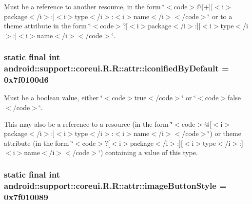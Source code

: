 Must be a reference to another resource, in the form \char`\"{}$<$code$>$@\mbox{[}+\mbox{]}\mbox{[}$<$i$>$package$<$/i$>$:\mbox{]}$<$i$>$type$<$/i$>$:$<$i$>$name$<$/i$>$$<$/code$>$\char`\"{} or to a theme attribute in the form \char`\"{}$<$code$>$?\mbox{[}$<$i$>$package$<$/i$>$:\mbox{]}\mbox{[}$<$i$>$type$<$/i$>$:\mbox{]}$<$i$>$name$<$/i$>$$<$/code$>$\char`\"{}. \hypertarget{classandroid_1_1support_1_1coreui_1_1_r_1_1attr_d091cd53f178a86e5e7803f5a1abd26a}{
\subsubsection[{iconifiedByDefault}]{\setlength{\rightskip}{0pt plus 5cm}static final int android::support::coreui.R.R::attr::iconifiedByDefault = 0x7f0100d6}}
\label{classandroid_1_1support_1_1coreui_1_1_r_1_1attr_d091cd53f178a86e5e7803f5a1abd26a}


Must be a boolean value, either \char`\"{}$<$code$>$true$<$/code$>$\char`\"{} or \char`\"{}$<$code$>$false$<$/code$>$\char`\"{}. 

This may also be a reference to a resource (in the form \char`\"{}$<$code$>$@\mbox{[}$<$i$>$package$<$/i$>$:\mbox{]}$<$i$>$type$<$/i$>$:$<$i$>$name$<$/i$>$$<$/code$>$\char`\"{}) or theme attribute (in the form \char`\"{}$<$code$>$?\mbox{[}$<$i$>$package$<$/i$>$:\mbox{]}\mbox{[}$<$i$>$type$<$/i$>$:\mbox{]}$<$i$>$name$<$/i$>$$<$/code$>$\char`\"{}) containing a value of this type. \hypertarget{classandroid_1_1support_1_1coreui_1_1_r_1_1attr_7515a1cd857cc5880fd0cd47bf56de94}{
\subsubsection[{imageButtonStyle}]{\setlength{\rightskip}{0pt plus 5cm}static final int android::support::coreui.R.R::attr::imageButtonStyle = 0x7f010089}}
\label{classandroid_1_1support_1_1coreui_1_1_r_1_1attr_7515a1cd857cc5880fd0cd47bf56de94}


